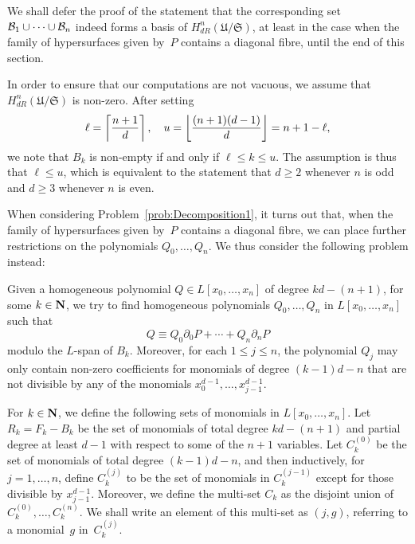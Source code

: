 We shall defer the proof of the statement that the corresponding 
set $\mathcal{B}_1 \cup \dotsb \cup \mathcal{B}_n$ indeed forms a basis of 
$H_{dR}^n(\mathfrak{U}/\mathfrak{S})$, at least in the case when 
the family of hypersurfaces given by~$P$ contains a diagonal fibre, 
until the end of this section.

\begin{rem}
In order to ensure that our computations are not vacuous, we assume that 
$H_{dR}^n(\mathfrak{U}/\mathfrak{S})$ is non-zero.  After setting 
\begin{equation*}
\ell = \left\lceil\frac{n+1}{d}\right\rceil, \quad u = \left\lfloor\frac{(n+1)(d-1)}{d}\right\rfloor = n+1 - \ell,
\end{equation*}
we note that $B_k$ is non-empty if and only if $\ell \leq k \leq u$.  The 
assumption is thus that $\ell \leq u$, which is equivalent to the statement 
that $d \geq 2$ whenever $n$ is odd and $d \geq 3$ whenever $n$ is even.
\end{rem}

When considering Problem~\ref{prob:Decomposition1}, it turns out that, 
when the family of hypersurfaces given by~$P$ contains a diagonal fibre, 
we can place further restrictions on the polynomials $Q_0, \dotsc, Q_n$.  We 
thus consider the following problem instead:

\begin{prob} \label{prob:Decomposition2}
Given a homogeneous polynomial $Q \in L[x_0, \dotsc, x_n]$ of degree 
$k d - (n + 1)$, for some $k \in \mathbf{N}$, we try to find homogeneous polynomials 
$Q_0, \dotsc, Q_n$ in $L[x_0, \dotsc, x_n]$ such that 
\begin{equation} \label{eq:PDecomposition2}
Q \equiv Q_0 \partial_0 P + \dotsb + Q_n \partial_n P
\end{equation}
modulo the $L$-span of $B_k$.  Moreover, for each $1 \leq j \leq n$,  the 
polynomial $Q_j$ may only contain non-zero coefficients for monomials of 
degree $(k-1)d-n$ that are not divisible by any of the monomials 
$x_0^{d-1}, \dotsc, x_{j-1}^{d-1}$.
\end{prob}

\begin{defn} \label{defn:IndexSets}
For $k \in \mathbf{N}$, we define the following sets of monomials in 
$L[x_0, \dotsc, x_n]$.  Let $R_k = F_k - B_k$ be the set of monomials of 
total degree $kd-(n+1)$ and partial degree at least $d-1$ with respect to some 
of the $n+1$ variables.  Let $C_k^{(0)}$ be the set of monomials of total 
degree $(k-1)d - n$, and then inductively, for $j = 1, \dotsc, n$, define 
$C_k^{(j)}$ to be the set of monomials in $C_k^{(j-1)}$ except for those 
divisible by $x_{j-1}^{d-1}$.  Moreover, we define the multi-set $C_k$ as 
the disjoint union of $C_k^{(0)}, \dotsc, C_k^{(n)}$.  We shall write an 
element of this multi-set as $(j, g)$, referring to a monomial~$g$ 
in~$C_k^{(j)}$.
\end{defn}

